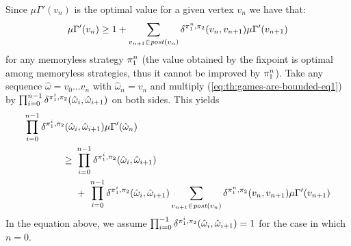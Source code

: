 \begin{myproof}
  Since $\mu \Gamma'(v_n)$ is the optimal value for a given vertex $v_{n}$ we have that:
  \begin{equation}\label{eq:th:games-are-bounded-eq1}
    \mu \Gamma'(v_n) \geq 1 + \sum_{v_{n+1} \in \mathit{post}(v_n)} \delta^{\pi_{1}^n, \pi_{2}}(v_n, v_{n+1}) \mu \Gamma'(v_{n+1})
  \end{equation}
  for any memoryless strategy $\pi_{1}^n$ (the value obtained by the
  fixpoint is optimal among memoryless strategies, thus it cannot be
  improved by $\pi_{1}^n$).
  Take any sequence $\hat{\omega} = v_0 \dots v_n$ with
  $\hat{\omega}_n = v_n$ and multiply
  (\ref{eq:th:games-are-bounded-eq1}) by
  $\prod^{n-1}_{i=0} \delta^{\pi_{1}^i, \pi_{2}}(\hat{\omega}_i, \hat{\omega}_{i+1})$
  on both sides.  This yields
  \begin{align}
    \prod^{n-1}_{i=0} \delta^{\strat{1}^i, \strat{2}}(\hat{\omega}_i, \hat{\omega}_{i+1}) \mu \Gamma'(\hat{\omega}_n)  \hspace{-6.5em}& \notag\\
    \geq \ & \prod^{n-1}_{i=0} \delta^{\strat{1}^i, \strat{2}}(\hat{\omega}_i, \hat{\omega}_{i+1}) \label{eq:th:games-are-bounded-eq2} \\
    & + \ \prod^{n-1}_{i=0} \delta^{\strat{1}^i, \strat{2}}(\hat{\omega}_i, \hat{\omega}_{i+1})\sum_{v_{n+1} \in \post(v_n)} \delta^{\strat{1}^n, \strat{2}}(v_n, v_{n+1}) \mu \Gamma'(v_{n+1}) \notag
  \end{align}
  In the equation above, we assume
  $\prod^{-1}_{i=0} \delta^{\pi_{1}^i, \pi_{2}}(\hat{\omega}_i, \hat{\omega}_{i+1}) = 1$
  for the case in which $n=0$.
  

\end{myproof}
